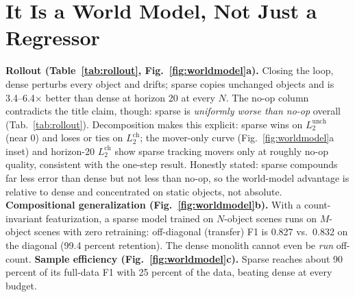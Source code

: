 \documentclass[conference]{IEEEtran}
\begin{document}
\section{It Is a World Model, Not Just a Regressor}\label{sec:worldmodel}
\textbf{Rollout (Table~\ref{tab:rollout}, Fig.~\ref{fig:worldmodel}a).} Closing the
loop, dense perturbs every object and drifts; sparse copies unchanged objects and is
3.4--6.4$\times$ better than dense at horizon 20 at every $N$. The no-op column
contradicts the title claim, though: sparse is \emph{uniformly worse than no-op}
overall (Tab.~\ref{tab:rollout}). Decomposition makes this explicit: sparse wins on
$L_2^{\text{unch}}$ (near 0) and loses or ties on $L_2^{\text{ch}}$; the mover-only
curve (Fig.~\ref{fig:worldmodel}a inset) and horizon-20 $L_2^{\text{ch}}$ show sparse
tracking movers only at roughly no-op quality, consistent with the one-step result.
Honestly stated: sparse compounds far less error than dense but not less than no-op,
so the world-model advantage is relative to dense and concentrated on static objects,
not absolute.
\textbf{Compositional generalization (Fig.~\ref{fig:worldmodel}b).} With a
count-invariant featurization, a sparse model trained on $N$-object scenes runs on
$M$-object scenes with zero retraining: off-diagonal (transfer) F1 is 0.827 vs.\ 0.832
on the diagonal (99.4 percent retention). The dense monolith cannot even be \emph{run}
off-count.
\textbf{Sample efficiency (Fig.~\ref{fig:worldmodel}c).} Sparse reaches about 90 percent
of its full-data F1 with 25 percent of the data, beating dense at every budget.
\end{document}
